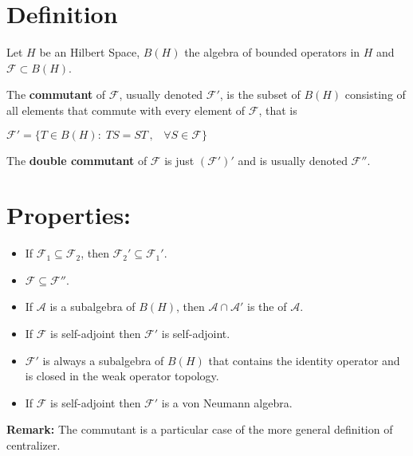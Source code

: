 \documentclass[12pt]{article}
\begin{document}
\section*{Definition}

Let $H$ be an Hilbert Space, $B(H)$ the algebra of bounded operators in $H$ and $\mathcal{F} \subset B(H)$.

The {\bf commutant} of $\mathcal{F}$, usually denoted $\mathcal{F}'$, is the subset of $B(H)$ consisting of all
 elements that commute with every element of $\mathcal{F}$, that is
\begin{center}
$\mathcal{F}'=\{T \in B(H):\; TS=ST \,,\;\;\; \forall S \in \mathcal{F}\}$
\end{center}

The {\bf double commutant} of $\mathcal{F}$ is just $(\mathcal{F}')'$ and is usually denoted $\mathcal{F}''$.

\section*{Properties:}
\begin{itemize}
\item If $\mathcal{F}_1 \subseteq \mathcal{F}_2$, then $\mathcal{F}_2' \subseteq \mathcal{F}_1'$.
\item $\mathcal{F} \subseteq \mathcal{F}''$.
\item If $\mathcal{A}$ is a subalgebra of $B(H)$, then $\mathcal{A} \cap \mathcal{A}'$ is the  of $\mathcal{A}$.
\item If $\mathcal{F}$ is self-adjoint then $\mathcal{F}'$ is self-adjoint.
\item $\mathcal{F}'$ is always a subalgebra of $B(H)$ that contains the identity operator and is closed in the weak operator topology.
\item If $\mathcal{F}$ is self-adjoint then $\mathcal{F}'$ is a von Neumann algebra.
\end{itemize}

{\bf Remark:} The commutant is a particular case of the more general definition of centralizer.
\end{document}
